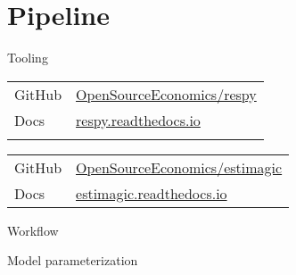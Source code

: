 \section{Pipeline}
\begin{frame}{Tooling}\vspace{0.25cm}

\begin{tabular}{ll}
GitHub  & \url{OpenSourceEconomics/respy}\\\medskip
Docs    & \url{respy.readthedocs.io}\\\vspace{0.1cm}
\end{tabular}

\begin{tabular}{ll}
GitHub	& \url{OpenSourceEconomics/estimagic}\\\medskip
Docs    & \url{estimagic.readthedocs.io}\\
\end{tabular}

\end{frame}
\begin{frame}{Workflow}
	\begin{figure}
	   
   \end{figure}
\end{frame}
\begin{frame}{Model parameterization}

	\begin{figure}[h!]\centering
	\end{figure}

\end{frame}
